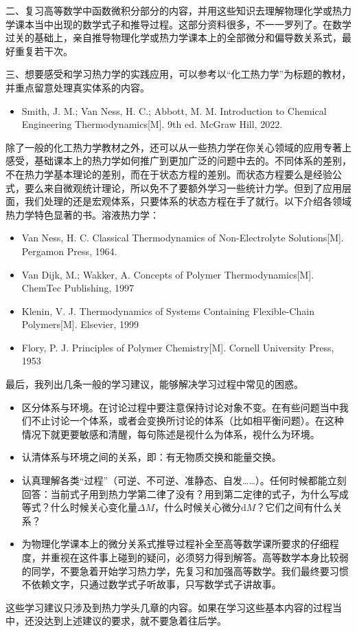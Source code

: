 \documentclass[main.tex]{subfiles}
\begin{document}
二、复习高等数学中函数微积分部分的内容，并用这些知识去理解物理化学或热力学课本当中出现的数学式子和推导过程。这部分资料很多，不一一罗列了。在数学过关的基础上，亲自推导物理化学或热力学课本上的全部微分和偏导数关系式，最好重复若干次。

三、想要感受和学习热力学的实践应用，可以参考以“化工热力学”为标题的教材，并重点留意处理真实体系的内容。
\begin{itemize}
    \item Smith, J. M.; Van Ness, H. C.; Abbott, M. M. Introduction to Chemical Engineering Thermodynamics[M]. 9th ed. McGraw Hill, 2022.
\end{itemize}
除了一般的化工热力学教材之外，还可以从一些热力学在你关心领域的应用专著上感受，基础课本上的热力学如何推广到更加广泛的问题中去的。不同体系的差别，不在热力学基本理论的差别，而在于状态方程的差别。而状态方程要么是经验公式，要么来自微观统计理论，所以免不了要额外学习一些统计力学。但到了应用层面，我们处理的还是宏观体系，只要体系的状态方程在手了就行。以下介绍各领域热力学特色显著的书。溶液热力学：
\begin{itemize}
    \item Van Ness, H. C. Classical Thermodynamics of Non-Electrolyte Solutions[M]. Pergamon Press, 1964.
    \item Van Dijk, M.; Wakker, A. Concepts of Polymer Thermodynamics[M]. ChemTec Publishing, 1997
    \item Klenin, V. J. Thermodynamics of Systems Containing Flexible-Chain Polymers[M]. Elsevier, 1999
    \item Flory, P. J. Principles of Polymer Chemistry[M]. Cornell University Press, 1953
\end{itemize}

最后，我列出几条一般的学习建议，能够解决学习过程中常见的困惑。
\begin{itemize}
    \item 区分体系与环境。在讨论过程中要注意保持讨论对象不变。在有些问题当中我们不止讨论一个体系，或者会变换所讨论的体系（比如相平衡问题）。在这种情况下就更要敏感和清醒，每句陈述是视什么为体系，视什么为环境。
    \item 认清体系与环境之间的关系，即：有无物质交换和能量交换。
    \item 认真理解各类“过程”（可逆、不可逆、准静态、自发……）。任何时候都能立刻回答：当前式子用到热力学第二律了没有？用到第二定律的式子，为什么写成等式？什么时候关心变化量$\Delta M$，什么时候关心微分$\mathrm{d}M$？它们之间有什么关系？
    \item 为物理化学课本上的微分关系式推导过程补全至高等数学课所要求的仔细程度，并重视在这件事上碰到的疑问，必须努力得到解答。高等数学本身比较弱的同学，不要急着开始学习热力学，先复习和加强高等数学。我们最终要习惯不依赖文字，只通过数学式子听故事，只写数学式子讲故事。
\end{itemize}
这些学习建议只涉及到热力学头几章的内容。如果在学习这些基本内容的过程当中，还没达到上述建议的要求，就不要急着往后学。
\end{document}
